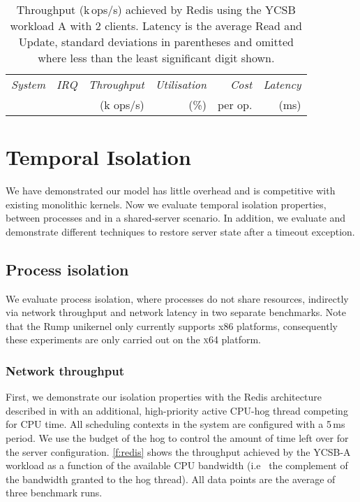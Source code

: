 \begin{table}[t]\centering
      \begin{tabularx}{\textwidth}{Xrrrrr}\toprule
          \emph{System}   & \emph{IRQ} & \emph{Throughput} & \emph{Utilisation} & \emph{Cost} & \emph{Latency} \\
                          &            & (k ops/s)         & (\%)               & per op.     & (ms)            \\
        \midrule

      
      \bottomrule
    \end{tabularx}
    \caption{Throughput (k\,ops/s) achieved by Redis using the YCSB
      workload A with 2 clients.  Latency is the average Read and Update,
      standard deviations in parentheses and omitted where less than the least
      significant digit shown.}
    \label{t:redis}
\end{table}

\section{Temporal Isolation}

We have demonstrated our model has little overhead and is competitive with existing monolithic
kernels. Now we evaluate temporal isolation properties, between processes and in a shared-server
scenario. 
In addition, we evaluate and demonstrate different
techniques to restore server state after a timeout exception.

\subsection{Process isolation} 

We evaluate process isolation, where processes do not share resources, indirectly via network
throughput and network latency in two separate benchmarks. Note that the Rump unikernel only
currently supports x86 platforms, consequently these experiments are only carried out on
the \textsc{x64} platform. 

\subsubsection{Network throughput}

First, we demonstrate our isolation properties with the Redis architecture described in
 with an additional, high-priority active CPU-hog thread
competing for \gls{CPU} time.  All scheduling contexts in the system are configured with a
5\,ms period. We use the budget of the hog to control the amount of time left over
for the server configuration. \autoref{f:redis} shows the throughput
achieved by the YCSB-A workload as a function of the available CPU
bandwidth (i.e \ the complement of the bandwidth granted to the hog
thread). All data points are the average of three benchmark runs.

